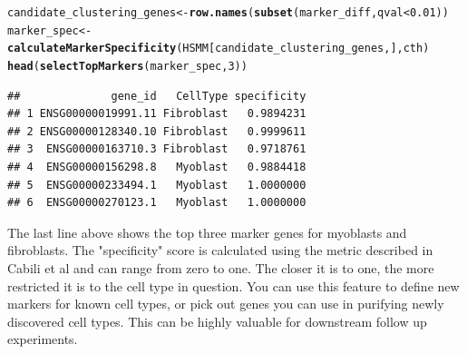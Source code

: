 \documentclass[10pt,oneside]{article}\usepackage[]{graphicx}\usepackage[]{color}
\makeatletter
\newcommand{\hlnum}[1]{\textcolor[rgb]{0.686,0.059,0.569}{#1}}%
\newcommand{\hlopt}[1]{\textcolor[rgb]{0,0,0}{#1}}%
\newcommand{\hlstd}[1]{\textcolor[rgb]{0.345,0.345,0.345}{#1}}%
\newcommand{\hlkwb}[1]{\textcolor[rgb]{0.69,0.353,0.396}{#1}}%
\newcommand{\hlkwd}[1]{\textcolor[rgb]{0.737,0.353,0.396}{\textbf{#1}}}%
\newenvironment{kframe}{%
 \def\at@end@of@kframe{}%
 \ifinner\ifhmode%
  \def\at@end@of@kframe{\end{minipage}}%
  \begin{minipage}{\columnwidth}%
 \fi\fi%
 \def\FrameCommand##1{\hskip\@totalleftmargin \hskip-\fboxsep
 \colorbox{shadecolor}{##1}\hskip-\fboxsep
     \hskip-\linewidth \hskip-\@totalleftmargin \hskip\columnwidth}%
 \MakeFramed {\advance\hsize-\width
   \@totalleftmargin\z@ \linewidth\hsize
   \@setminipage}}%
 {\par\unskip\endMakeFramed%
 \at@end@of@kframe}
\newenvironment{knitrout}{}{} %
\makeatother
\begin{document}
\begin{knitrout}
\color{fgcolor}\begin{kframe}
\begin{alltt}
\hlstd{candidate_clustering_genes} \hlkwb{<-} \hlkwd{row.names}\hlstd{(}\hlkwd{subset}\hlstd{(marker_diff, qval} \hlopt{<} \hlnum{0.01}\hlstd{))}
\hlstd{marker_spec} \hlkwb{<-} \hlkwd{calculateMarkerSpecificity}\hlstd{(HSMM[candidate_clustering_genes,], cth)}
\hlkwd{head}\hlstd{(}\hlkwd{selectTopMarkers}\hlstd{(marker_spec,} \hlnum{3}\hlstd{))}
\end{alltt}
\begin{verbatim}
##              gene_id   CellType specificity
## 1 ENSG00000019991.11 Fibroblast   0.9894231
## 2 ENSG00000128340.10 Fibroblast   0.9999611
## 3  ENSG00000163710.3 Fibroblast   0.9718761
## 4  ENSG00000156298.8   Myoblast   0.9884418
## 5  ENSG00000233494.1   Myoblast   1.0000000
## 6  ENSG00000270123.1   Myoblast   1.0000000
\end{verbatim}
\end{kframe}
\end{knitrout}
The last line above shows the top three marker genes for myoblasts and fibroblasts. The "specificity" score is calculated using the metric described in Cabili et al \cite{CABILI} and can range from zero to one. The closer it is to one, the more restricted it is to the cell type in question. You can use this feature to define new markers for known cell types, or pick out genes you can use in purifying newly discovered cell types. This can be highly valuable for downstream follow up experiments.
\end{document}
